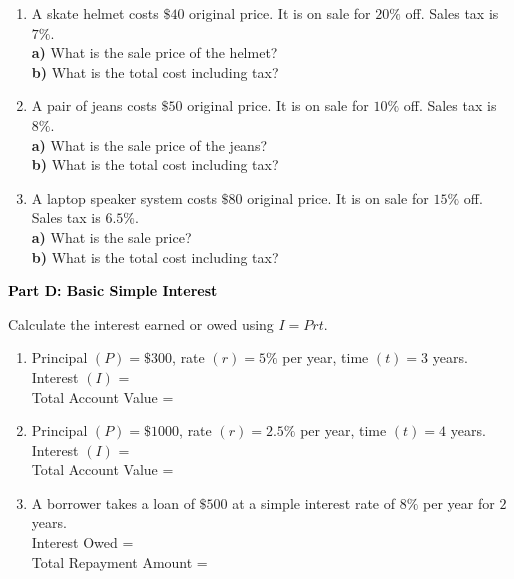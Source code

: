 \documentclass[12pt, letterpaper, fleqn]{article}
\newcommand{\blanklong}{\underline{\hspace{6.5cm}}}
\begin{document}
\begin{enumerate}[itemsep=2.5cm, leftmargin=0.6cm]
\item A skate helmet costs $\$40$ original price. It is on sale for $20\%$ off. Sales tax is $7\%$. \\
\textbf{a)} What is the sale price of the helmet? \blanklong \\
\textbf{b)} What is the total cost including tax? \blanklong

\item A pair of jeans costs $\$50$ original price. It is on sale for $10\%$ off. Sales tax is $8\%$. \\
\textbf{a)} What is the sale price of the jeans? \blanklong \\
\textbf{b)} What is the total cost including tax? \blanklong

\item A laptop speaker system costs $\$80$ original price. It is on sale for $15\%$ off. Sales tax is $6.5\%$. \\
\textbf{a)} What is the sale price? \blanklong \\
\textbf{b)} What is the total cost including tax? \blanklong
\end{enumerate}

\newpage

\begin{tcolorbox}[colback=black!10]
    \large\textcolor{black}{\textbf{Part D: Basic Simple Interest}}
\end{tcolorbox}

\vspace{3mm}

\noindent
Calculate the interest earned or owed using $I = Prt$.

\vspace{5mm}

\begin{enumerate}[itemsep=2.5cm, leftmargin=0.6cm]
\item Principal $(P) = \$300$, rate $(r) = 5\%$ per year, time $(t) = 3$ years. \\
Interest $(I)$ = \blanklong \\
Total Account Value = \blanklong

\item Principal $(P) = \$1000$, rate $(r) = 2.5\%$ per year, time $(t) = 4$ years. \\
Interest $(I)$ = \blanklong \\
Total Account Value = \blanklong

\item A borrower takes a loan of $\$500$ at a simple interest rate of $8\%$ per year for $2$ years. \\
Interest Owed = \blanklong \\
Total Repayment Amount = \blanklong
\end{enumerate}
\end{document}

